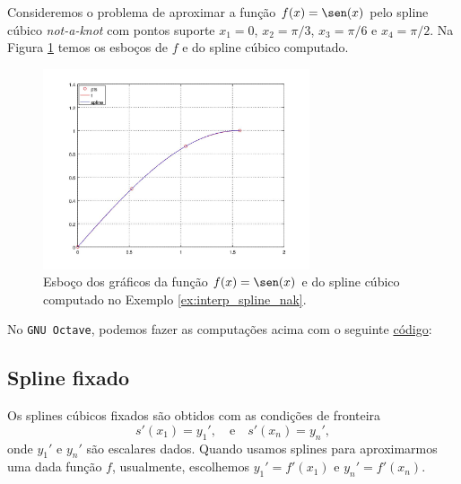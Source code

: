 \begin{ex}\label{ex:interp_spline_nak}
  Consideremos o problema de aproximar a função $f(x)=\sen(x)$ pelo spline cúbico {\it not-a-knot} com pontos suporte $x_1=0$, $x_2=\pi/3$, $x_3=\pi/6$ e $x_4=\pi/2$. Na Figura \ref{fig:interp_spline_nak} temos os esboços de $f$ e do spline cúbico computado.

  \begin{figure}[h!]
    \centering
    \includegraphics[width=0.7\textwidth]{./cap_interp/dados/ex_interp_spline_nak/fig_interp_spline_nak}
    \caption{Esboço dos gráficos da função $f(x)=\sen(x)$ e do spline cúbico computado no Exemplo \ref{ex:interp_spline_nak}.}
    \label{fig:interp_spline_nak}
  \end{figure}

\ifisoctave
No \verb+GNU Octave+, podemos fazer as computações acima com o seguinte \href{https://github.com/phkonzen/notas/blob/master/src/MatematicaNumerica/cap_interp/dados/ex_interp_spline_nak/ex_interp_spline_nak.m}{código}:

\fi
\end{ex}

\subsection{Spline fixado}

Os splines cúbicos fixados são obtidos com as condições de fronteira
\begin{equation}
  s'(x_1)=y_1',\quad\text{e}\quad s'(x_n)=y_n',
\end{equation}
onde $y_1'$ e $y_n'$ são escalares dados. Quando usamos splines para aproximarmos uma dada função $f$, usualmente, escolhemos $y_1'=f'(x_1)$ e $y_n'=f'(x_n)$.

